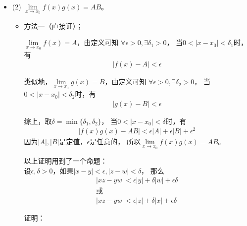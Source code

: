 \documentclass{article}
\begin{document}
\begin{itemize}
  \item (2) $\lim\limits_{x \to x_0} f(x) g(x) = AB$。

        \begin{itemize}
          \item 方法一（直接证）；

                $\lim\limits_{x \to x_0} f(x) = A$，由定义可知
                $\forall \epsilon > 0, \exists \delta_1 > 0$，
                当$0 < |x - x_0| < \delta_1$时，有
                \begin{align*}
                  |f(x) - A| < \epsilon
                \end{align*}

                类似地，$\lim\limits_{x \to x_0} g(x) = B$，由定义可知
                $\forall \epsilon > 0, \exists \delta_2 > 0$，
                当$0 < |x - x_0| < \delta_2$时，有
                \begin{align*}
                  |g(x) - B| < \epsilon
                \end{align*}

                综上，取$\delta = \min\{\delta_1, \delta_2\}$，
                当$0 < |x - x_0| < \delta$时，有
                \begin{align*}
                  |f(x)g(x) - AB| < \epsilon|A| + \epsilon|B| + \epsilon^2
                \end{align*}
                因为$|A|, |B|$是定值，$\epsilon$是任意的，
                所以$\lim \limits_{x \to x_0} f(x) g(x) = AB$。

                \begin{zremark}
                  以上证明用到了一个命题：\\
                  设$\epsilon, \delta > 0$，如果$|x - y| < \epsilon, |z - w| < \delta$，
                  那么
                  \begin{align*}
                    |xz - yw| < \epsilon|y| + \delta|w| + \epsilon \delta \\
                    \textbf{或}                                            \\
                    |xz - yw| < \epsilon|z| + \delta|x| + \epsilon \delta
                  \end{align*}

                  证明：


\end{zremark}
\end{itemize}
\end{itemize}
\end{document}
